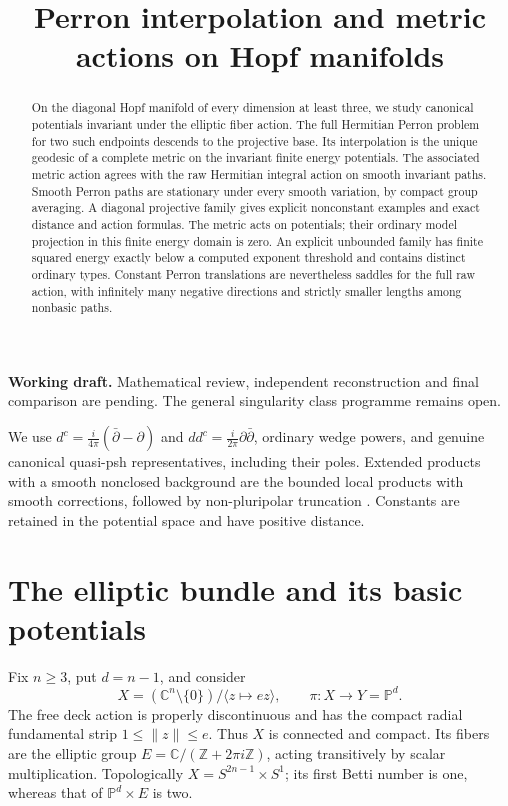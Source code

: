 \documentclass[11pt]{article}
\title{Perron interpolation and metric actions on Hopf manifolds}
\author{}
\date{}
\newcommand{\ddc}{dd^c}
\newcommand{\PP}{\mathbb P}
\theoremstyle{remark}\newtheorem{remark}[theorem]{Remark}
\begin{document}
\maketitle
\noindent\textbf{Working draft.} Mathematical review, independent
reconstruction and final comparison are pending. The general singularity
class programme remains open.
\begin{abstract}
On the diagonal Hopf manifold of every dimension at least three, we study
canonical potentials invariant under the elliptic fiber action. The full
Hermitian Perron problem for two such endpoints descends to the projective
base. Its interpolation is the unique geodesic of a complete metric on the
invariant finite energy potentials. The associated metric action agrees
with the raw Hermitian integral action on smooth invariant paths. Smooth
Perron paths are stationary under every smooth variation, by compact group
averaging. A diagonal projective family gives explicit nonconstant examples
and exact distance and action formulas. The metric acts on potentials;
their ordinary model projection in this finite energy domain is zero.
An explicit unbounded family has finite squared energy exactly below a
computed exponent threshold and contains distinct ordinary types.
Constant Perron translations are nevertheless saddles for the full raw
action, with infinitely many negative directions and strictly smaller
lengths among nonbasic paths.
\end{abstract}

We use $d^c=\frac{i}{4\pi}(\bar\partial-\partial)$ and
$\ddc=\frac{i}{2\pi}\partial\bar\partial$, ordinary wedge powers,
and genuine canonical quasi-psh representatives, including their poles.
Extended products with a smooth nonclosed background are the bounded
local products with smooth corrections, followed by non-pluripolar
truncation \cite[Section 2.1]{BGL}. Constants are retained in the potential
space and have positive distance.

\section{The elliptic bundle and its basic potentials}
Fix $n\geq3$, put $d=n-1$, and consider
\[
 X=(\mathbb C^n\setminus\{0\})/\langle z\mapsto ez\rangle,
 \qquad \pi:X\longrightarrow Y=\PP^d.
\]
The free deck action is properly discontinuous and has the compact radial
fundamental strip $1\leq\lVert z\rVert\leq e$. Thus $X$ is connected and
compact. Its fibers are the elliptic group
$E=\mathbb C/(\mathbb Z+2\pi i\mathbb Z)$, acting transitively by
scalar multiplication. Topologically $X=S^{2n-1}\times S^1$; its first
Betti number is one, whereas that of $\PP^d\times E$ is two.
\end{document}
